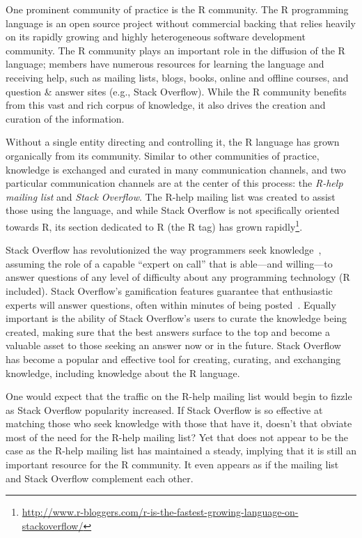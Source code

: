 \documentclass[smallextended]{svjour3}       %
\newcommand{\channels}{communication channels\xspace}
\newcommand{\SO}{Stack Overflow\xspace}
\newcommand{\RH}{R-help\xspace}
\begin{document}
One prominent community of practice is the R community. The R
programming language is an open source project without commercial
backing that relies heavily on its rapidly growing and highly
heterogeneous software development community. The R community plays an
important role in the diffusion of the R language; members have
numerous resources for learning the language and receiving help, such
as mailing lists, blogs, books, online and offline courses, and
question \& answer sites (e.g., \SO). While the R community benefits
from this vast and rich corpus of knowledge, it also drives the
creation and curation of the information.

Without a single entity directing and controlling it, the R language has grown organically from its community. Similar to other communities of practice, knowledge is exchanged and curated in many \channels, and two particular \channels are at the center of this process: the \textit{\RH mailing list} and \textit{\SO}. The \RH mailing list was created to assist those using the language, and while \SO is not specifically oriented towards R, its section dedicated to R (the R tag) has grown rapidly\footnote{\href{http://www.r-bloggers.com/r-is-the-fastest-growing-language-on-stackoverflow/}{http://www.r-bloggers.com/r-is-the-fastest-growing-language-on-stackoverflow/}}.

\SO has revolutionized the way programmers seek knowledge~\cite{li2013help,Vasilescu2014c}, assuming the role of a capable ``expert on call'' that is able---and willing---to answer questions of any level of difficulty about any programming technology (R included). \SO's gamification features guarantee that enthusiastic experts will answer questions, often within minutes of being posted~\cite{Mamykina2011}. Equally important is the ability of \SO's users to curate the knowledge being created, making sure that the best answers surface to the top and become a valuable asset to those seeking an answer now or in the future. \SO has become a popular and effective tool for creating, curating, and exchanging knowledge, including knowledge about the R language.

One would expect that the traffic on the \RH mailing list would begin
to fizzle as \SO popularity increased. If \SO is so effective at
matching those who seek knowledge with those that have it, doesn't
that obviate most of the need for the \RH mailing list? Yet that does
not appear to be the case as the \RH mailing list has maintained a
steady, implying that it is still an important resource for the R
community. It even appears as if the mailing list and \SO complement
each other.
\end{document}
